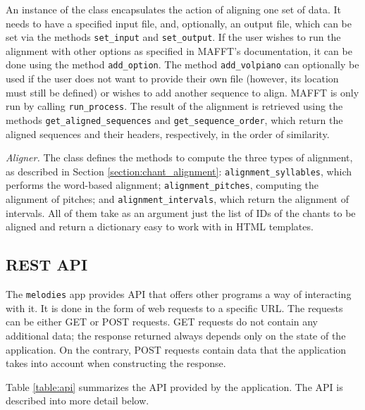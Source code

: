 An instance of the class encapsulates the action of aligning one set of data. It needs to have a specified input file, and, optionally, an output file, which can be set
via the methods \verb|set_input| and \verb|set_output|. If the user wishes to run the alignment with other options as specified in MAFFT's documentation, it can be done
using the method \verb|add_option|. The method \verb|add_volpiano| can optionally be used if the user does not want to provide their own file (however, its location must
still be defined) or wishes to add another sequence to align. MAFFT is only run by calling \verb|run_process|. The result of the alignment is retrieved using the methods
\verb|get_aligned_sequences| and \verb|get_sequence_order|, which return the aligned sequences and their headers, respectively, in the order of similarity.

\emph{Aligner.} The class defines the methods to compute the three types of alignment, as described in Section \ref{section:chant_alignment}: \verb|alignment_syllables|,
which performs the word-based alignment; \verb|alignment_pitches|, computing the alignment of pitches; and \verb|alignment_intervals|, which return the alignment of 
intervals. All of them take as an argument just the list of IDs of the chants to be aligned and return a dictionary easy to work with in HTML templates.

\subsection{REST API}
\label{section:api}

The \verb|melodies| app provides API that offers other programs a way of interacting with it. It is done in the form of web requests to a specific URL. The requests
can be either GET or POST requests. GET requests do not contain any additional data; the response returned always depends only on the state of the application. On
the contrary, POST requests contain data that the application takes into account when constructing the response.

Table \ref{table:api} summarizes the API provided by the application. The API is described into more detail below.

